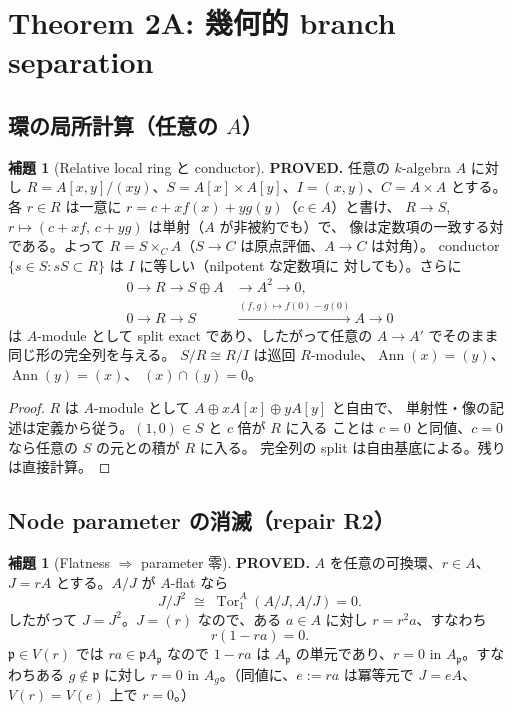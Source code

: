 \documentclass[11pt,a4paper]{article}
\numberwithin{equation}{section}
\theoremstyle{definition}
\newtheorem{lemma}[definition]{補題}
\DeclareMathOperator{\Ann}{Ann}
\begin{document}
\section{Theorem 2A: 幾何的 branch separation}\label{sec:2A}

\subsection{環の局所計算（任意の \(A\)）}

\begin{lemma}[Relative local ring と conductor]\label{lem:local-ring}
\textbf{PROVED.}
任意の \(k\)-algebra \(A\) に対し
\(R=A[x,y]/(xy)\)、\(S=A[x]\times A[y]\)、\(I=(x,y)\)、\(C=A\times A\) とする。
各 \(r\in R\) は一意に \(r=c+xf(x)+yg(y)\)（\(c\in A\)）と書け、
\(R\to S\), \(r\mapsto(c+xf,\,c+yg)\) は単射（\(A\) が非被約でも）で、
像は定数項の一致する対である。よって
\(R=S\times_{C}A\)（\(S\to C\) は原点評価、\(A\to C\) は対角）。
conductor \(\{s\in S:sS\subset R\}\) は \(I\) に等しい（nilpotent な定数項に
対しても）。さらに
\begin{align}
  0\to R\to S\oplus A&\to A^2\to0, \tag{2.1}\label{eq:C2}\\
  0\to R\to S&\xrightarrow{(f,g)\mapsto f(0)-g(0)}A\to0 \tag{2.2}\label{eq:C3}
\end{align}
は \(A\)-module として split exact であり、したがって任意の
\(A\to A'\) でそのまま同じ形の完全列を与える。
\(S/R\cong R/I\) は巡回 \(R\)-module、\(\Ann(x)=(y)\)、\(\Ann(y)=(x)\)、
\((x)\cap(y)=0\)。
\end{lemma}

\begin{proof}
\(R\) は \(A\)-module として \(A\oplus xA[x]\oplus yA[y]\) と自由で、
単射性・像の記述は定義から従う。\((1,0)\in S\) と \(c\) 倍が \(R\) に入る
ことは \(c=0\) と同値、\(c=0\) なら任意の \(S\) の元との積が \(R\) に入る。
完全列の split は自由基底による。残りは直接計算。
\end{proof}

\subsection{Node parameter の消滅（repair R2）}

\begin{lemma}[Flatness $\Rightarrow$ parameter 零]\label{lem:flat-zero}
\textbf{PROVED.}
\(A\) を任意の可換環、\(r\in A\)、\(J=rA\) とする。\(A/J\) が \(A\)-flat なら
\[
  J/J^2\;\cong\;\operatorname{Tor}_1^A(A/J,A/J)=0 .
\]
したがって \(J=J^2\)。\(J=(r)\) なので、ある \(a\in A\) に対し
\(r=r^2a\)、すなわち
\[
  r(1-ra)=0 .
\]
\(\mathfrak p\in V(r)\) では \(ra\in\mathfrak p A_{\mathfrak p}\) なので
\(1-ra\) は \(A_{\mathfrak p}\) の単元であり、\(r=0\) in
\(A_{\mathfrak p}\)。すなわちある \(g\notin\mathfrak p\) に対し
\(r=0\) in \(A_g\)。（同値に、\(e:=ra\) は冪等元で \(J=eA\)、
\(V(r)=V(e)\) 上で \(r=0\)。）
\end{lemma}
\end{document}
